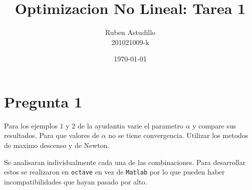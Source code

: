 \documentclass[letterpaper]{article}
\begin{document}
\title{Optimizacion No Lineal: Tarea 1}
\author{Ruben Astudillo \\ 201021009-k}
\date{\today}
\maketitle

\section*{Pregunta 1}
\noindent Para los ejemplos \(1\) y \(2\) de la ayudantia varie el
parametro \(\alpha\) y compare sus resultados. Para que valores de
\(\alpha\) no se tiene convergencia. Utilizar los metodos de maximo
descenso y de Newton.
\newline

Se analisaran individualmente cada una de las combinaciones. Para
desarrollar estos se realizaron en \texttt{octave} en vez de
\texttt{Matlab} por lo que pueden haber incompatibilidades que hayan
pasado por alto.󠀿
\end{document}
